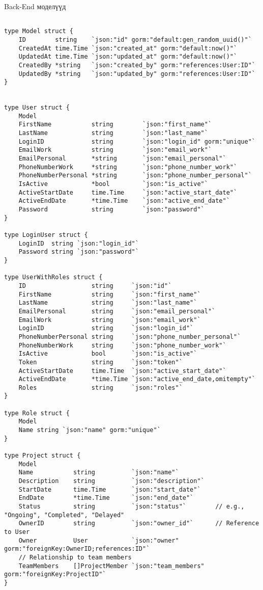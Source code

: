 \par Back-End моделүүд
\begin{lstlisting}[language=Golang, caption=Models, frame=single]

type Model struct {
    ID        string    `json:"id" gorm:"default:gen_random_uuid()"`
    CreatedAt time.Time `json:"created_at" gorm:"default:now()"`
    UpdatedAt time.Time `json:"updated_at" gorm:"default:now()"`
    CreatedBy *string   `json:"created_by" gorm:"references:User:ID"`
    UpdatedBy *string   `json:"updated_by" gorm:"references:User:ID"`
}
    

type User struct {
	Model   
	FirstName           string        `json:"first_name"`
	LastName            string        `json:"last_name"`
	LoginID             string        `json:"login_id" gorm:"unique"`
	EmailWork           string        `json:"email_work"`
	EmailPersonal       *string       `json:"email_personal"`
	PhoneNumberWork     *string       `json:"phone_number_work"`
	PhoneNumberPersonal *string       `json:"phone_number_personal"`
	IsActive            *bool         `json:"is_active"`
	ActiveStartDate     time.Time     `json:"active_start_date"`
	ActiveEndDate       *time.Time    `json:"active_end_date"`
	Password            string        `json:"password"`
}

type LoginUser struct {
	LoginID  string `json:"login_id"`
	Password string `json:"password"`
}

type UserWithRoles struct {
	ID                  string     `json:"id"`
	FirstName           string     `json:"first_name"`
	LastName            string     `json:"last_name"`
	EmailPersonal       string     `json:"email_personal"`
	EmailWork           string     `json:"email_work"`
	LoginID             string     `json:"login_id"`
	PhoneNumberPersonal string     `json:"phone_number_personal"`
	PhoneNumberWork     string     `json:"phone_number_work"`
	IsActive            bool       `json:"is_active"`
	Token               string     `json:"token"`
	ActiveStartDate     time.Time  `json:"active_start_date"`
	ActiveEndDate       *time.Time `json:"active_end_date,omitempty"`
	Roles               string     `json:"roles"`
}

type Role struct {
	Model
	Name string `json:"name" gorm:"unique"`
}

type Project struct {
	Model
	Name           string          `json:"name"`
	Description    string          `json:"description"`
	StartDate      time.Time       `json:"start_date"`
	EndDate        *time.Time      `json:"end_date"`
	Status         string          `json:"status"`        // e.g., "Ongoing", "Completed", "Delayed"
	OwnerID        string          `json:"owner_id"`      // Reference to User
	Owner          User            `json:"owner" gorm:"foreignKey:OwnerID;references:ID"`
	// Relationship to team members
	TeamMembers    []ProjectMember `json:"team_members" gorm:"foreignKey:ProjectID"`
}


\end{lstlisting}
